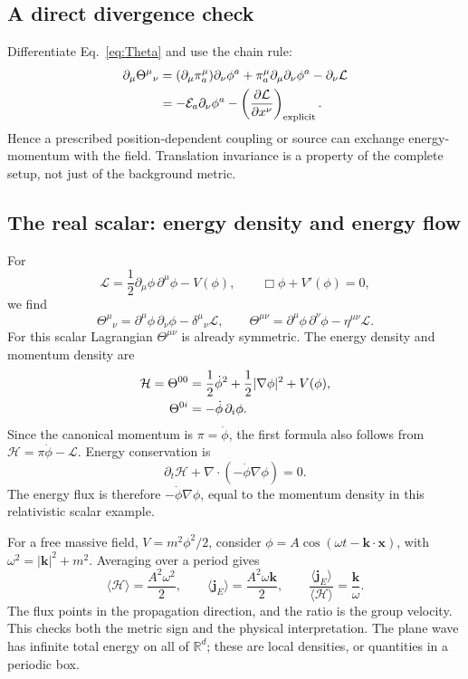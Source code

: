 \documentclass[11pt]{article}
\newcommand{\R}{\mathbb{R}}
\newcommand{\Lag}{\mathcal{L}}
\newcommand{\Th}{\Theta}
\newcommand{\Eul}{\mathcal E}
\begin{document}
\subsection{A direct divergence check}
Differentiate Eq.~\eqref{eq:Theta} and use the chain rule:
\begin{align}
\partial_\mu\Th^\mu{}_{\nu}
&=(\partial_\mu\pi_a^\mu)\partial_\nu\phi^a
 +\pi_a^\mu\partial_\mu\partial_\nu\phi^a
 -\partial_\nu\Lag\notag\\
&=-\Eul_a\partial_\nu\phi^a
 -\left(\frac{\partial\Lag}{\partial x^\nu}\right)_{\rm explicit}.
\label{eq:ThetaDivergence}
\end{align}
Hence a prescribed position-dependent coupling or source can exchange
energy-momentum with the field. Translation invariance is a property of
the complete setup, not just of the background metric.

\subsection{The real scalar: energy density and energy flow}
For
\begin{equation}
\Lag=\frac12\partial_\mu\phi\,\partial^\mu\phi-V(\phi),
\qquad \Box\phi+V'(\phi)=0,
\end{equation}
we find
\begin{equation}
\Th^\mu{}_{\nu}=\partial^\mu\phi\,\partial_\nu\phi
-\delta^\mu{}_{\nu}\Lag,
\qquad
\Th^{\mu\nu}=\partial^\mu\phi\,\partial^\nu\phi-\eta^{\mu\nu}\Lag.
\label{eq:scalarTheta}
\end{equation}
For this scalar Lagrangian \(\Th^{\mu\nu}\) is already symmetric.
The energy density and momentum density are
\begin{align}
\mathcal H=\Th^{00}
&=\frac12\dot\phi^2+\frac12|\nabla\phi|^2+V(\phi),\notag\\
\Th^{0i}&=-\dot\phi\,\partial_i\phi.
\label{eq:scalarEnergy}
\end{align}
Since the canonical momentum is \(\pi=\dot\phi\), the first formula also
follows from \(\mathcal H=\pi\dot\phi-\Lag\). Energy conservation is
\begin{equation}
\partial_t\mathcal H+\nabla\cdot(-\dot\phi\nabla\phi)=0.
\end{equation}
The energy flux is therefore \(-\dot\phi\nabla\phi\), equal to the
momentum density in this relativistic scalar example.

For a free massive field, \(V=m^2\phi^2/2\), consider
\(\phi=A\cos(\omega t-\bm k\cdot\bm x)\), with
\(\omega^2=|\bm k|^2+m^2\). Averaging over a period gives
\begin{equation}
\langle\mathcal H\rangle=\frac{A^2\omega^2}{2},\qquad
\langle\bm j_E\rangle=\frac{A^2\omega\bm k}{2},\qquad
\frac{\langle\bm j_E\rangle}{\langle\mathcal H\rangle}
=\frac{\bm k}{\omega}.
\end{equation}
The flux points in the propagation direction, and the ratio is the group
velocity. This checks both the metric sign and the physical interpretation.
The plane wave has infinite total energy on all of \(\R^d\); these are
local densities, or quantities in a periodic box.
\end{document}
